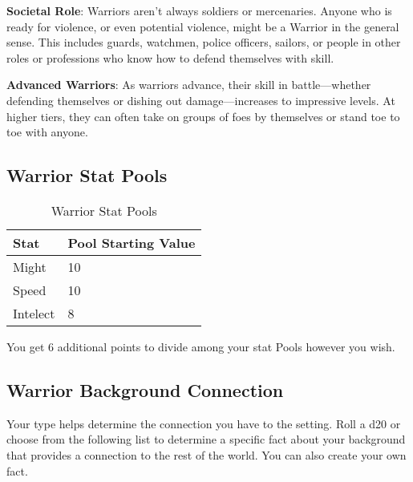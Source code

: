 \begin{multicols}{2}
\textbf{Societal Role}: Warriors aren’t always soldiers or mercenaries. Anyone who is ready for violence, or even potential violence, might be a Warrior in the general sense. This includes guards, watchmen, police officers, sailors, or people in other roles or professions who know how to defend themselves with skill. 

\textbf{Advanced Warriors}: As warriors advance, their skill in battle—whether defending themselves or dishing out damage—increases to impressive levels. At higher tiers, they can often take on groups of foes by themselves or stand toe to toe with anyone.

\subsection{Warrior Stat Pools}

\begin{table}[H]
\centering
\caption{Warrior Stat Pools}
\label{tab: Warrior Stat Pools}

\begin{tabularx}{\linewidth}{| X | X |}
\hline
\textbf{Stat} & \textbf{Pool Starting Value} \\
\hline
Might & 10 \\ \hline
Speed & 10 \\ \hline
Intelect & 8  \\ \hline

\end{tabularx}

\end{table}

\raggedright

You get 6 additional points to divide among your stat Pools however you wish.

\subsection{Warrior Background Connection}

Your type helps determine the connection you have to the setting. Roll a d20 or choose from the following list to determine a specific fact about your background that provides a connection to the rest of the world. You can also create your own fact.

\begin{table*}
\centering


\end{table*}
\end{multicols}
